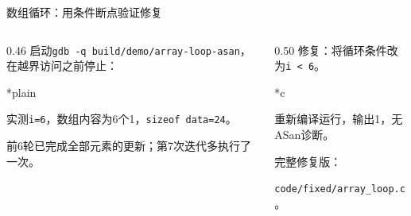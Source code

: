 \begin{frame}{数组循环：用条件断点验证修复}
    \begin{columns}[T]
        \begin{column}{0.46\textwidth}
            \small 启动\texttt{gdb -q build/demo/array-loop-asan}，在越界访问之前停止：
            \begin{Code}*{plain}
                
            \end{Code}
            \small 实测\texttt{i=6}，数组内容为6个1，\texttt{sizeof data=24}。
            \par\medskip
            前6轮已完成全部元素的更新；\alert{第7次迭代多执行了一次。}
        \end{column}
        \begin{column}{0.50\textwidth}
            \small 修复：将循环条件改为\texttt{i < 6}。
            \begin{Code}*{c}
                
            \end{Code}
            \small 重新编译运行，输出\alert{1}，无ASan诊断。
            \par\medskip
            \footnotesize 完整修复版：\par\texttt{code/fixed/array\_loop.c}。
        \end{column}
    \end{columns}
\end{frame}
